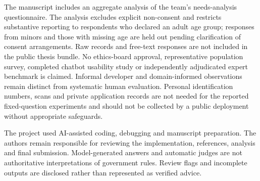 The manuscript includes an aggregate analysis of the team's needs-analysis questionnaire. The analysis excludes explicit non-consent and restricts substantive reporting to respondents who declared an adult age group; responses from minors and those with missing age are held out pending clarification of consent arrangements. Raw records and free-text responses are not included in the public thesis bundle. No ethics-board approval, representative population survey, completed chatbot usability study or independently adjudicated expert benchmark is claimed. Informal developer and domain-informed observations remain distinct from systematic human evaluation. Personal identification numbers, scans and private application records are not needed for the reported fixed-question experiments and should not be collected by a public deployment without appropriate safeguards.

The project used AI-assisted coding, debugging and manuscript preparation. The authors remain responsible for reviewing the implementation, references, analysis and final submission. Model-generated answers and automatic judges are not authoritative interpretations of government rules. Review flags and incomplete outputs are disclosed rather than represented as verified advice.
\clearpage
